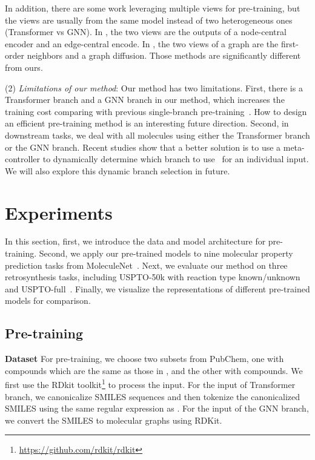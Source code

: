 \documentclass{article}
\begin{document}
In addition, there are some work leveraging multiple views for pre-training, but the views are usually from the same model instead of two heterogeneous ones (Transformer vs GNN). In \citep{ma2020multi}, the two views are the outputs of a node-central encoder and an edge-central encode. In \citep{hassani2020contrastive}, the two views of a graph are the first-order neighbors
and a graph diffusion. Those methods are significantly different from ours.

(2) {\it Limitations of our method}:\label{discussion_limitation} Our method has two limitations. First, there is a Transformer branch and a GNN branch in our method, which increases the training cost comparing with previous single-branch pre-training~\cite{chithrananda2020chemberta,wang2021molclr}. How to design an efficient pre-training method is an interesting future direction. Second, in downstream tasks, we deal with all molecules using either the Transformer branch or the GNN branch. Recent studies show that a better solution is to use a meta-controller to dynamically determine which branch to use~\cite{zhu2021iot,elbayad2019depth} for an individual input. We will also explore this dynamic branch selection in future. 



  

 
\section{Experiments}
In this section, first, we introduce the data and model architecture for pre-training. Second, we apply our pre-trained models to nine molecular property prediction tasks from MoleculeNet~\cite{wu2018moleculenet}. Next, we evaluate our method on three retrosynthesis tasks, including USPTO-50k with reaction type known/unknown and USPTO-full~\cite{tetko2020state}. Finally, we visualize the representations of different pre-trained models for comparison.
\subsection{Pre-training}
\noindent\textbf{Dataset}
For pre-training, we choose two subsets from PubChem, one with  compounds which are the same as those in \cite{wang2021molclr,chithrananda2020chemberta}, and the other with  compounds. We first use the RDkit toolkit\footnote{\url{https://github.com/rdkit/rdkit}} to process the input. For the input of Transformer branch, we canonicalize SMILES sequences and then tokenize the canonicalized SMILES using the same regular expression as \cite{schwaller2019molecular}. For the input of the GNN branch, we convert the SMILES to molecular graphs using RDKit. 
\end{document}
